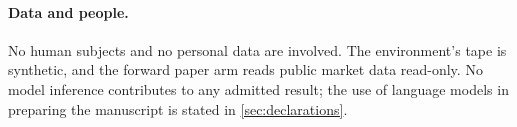 \paragraph{Data and people.} No human subjects and no personal data are involved. The environment's tape is synthetic, and the forward paper arm reads public market data read-only. No model inference contributes to any admitted result; the use of language models in preparing the manuscript is stated in \cref{sec:declarations}.

